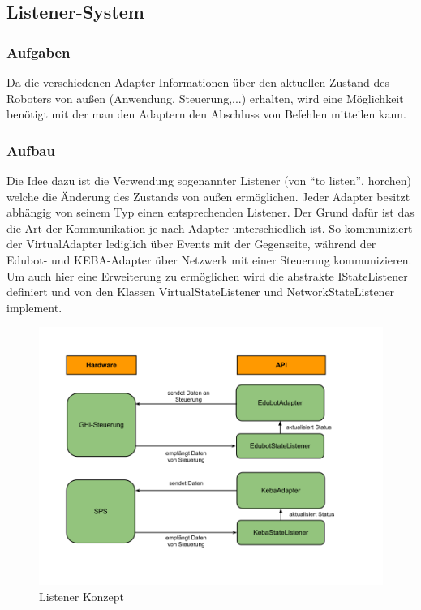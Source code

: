 \subsection{Listener-System}

\subsubsection{Aufgaben}
Da die verschiedenen Adapter Informationen über den aktuellen Zustand des Roboters von außen (Anwendung, Steuerung,...) erhalten, wird eine Möglichkeit benötigt mit der man den Adaptern den Abschluss von Befehlen mitteilen kann.

\subsubsection{Aufbau}
Die Idee dazu ist die Verwendung sogenannter Listener (von “to listen”, horchen) welche die Änderung des Zustands von außen ermöglichen. Jeder Adapter besitzt abhängig von seinem Typ einen entsprechenden Listener. Der Grund dafür ist das die Art der Kommunikation je nach Adapter unterschiedlich ist. So kommuniziert der VirtualAdapter lediglich über Events mit der Gegenseite, während der Edubot- und KEBA-Adapter über Netzwerk mit einer Steuerung kommunizieren. Um auch hier eine Erweiterung zu ermöglichen wird die abstrakte IStateListener definiert und von den Klassen VirtualStateListener und NetworkStateListener implement.

\begin{figure}[H]
  \centering
  \begin{minipage}[t]{12 cm}
  	\centering
  	\includegraphics[width=12cm]{images/ListenerSystem} 
    \caption{Listener Konzept}
  \end{minipage}
\end{figure}

